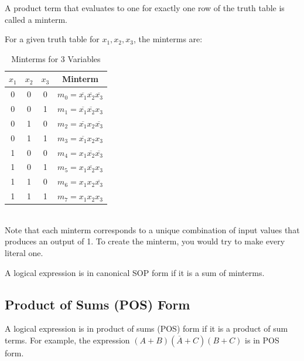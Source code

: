 \documentclass[11pt]{report}
\begin{document}
\begin{definition}[Minterm]
    A product term that evaluates to one for exactly one row of the truth table is called a minterm.
\end{definition}
\begin{example}[Minterm]
    For a given truth table for $x_1, x_2, x_3$, the minterms are:
    \begin{table}[h!]
        \centering
        \begin{tabular}{|c|c|c|c|}
            \hline
            $x_1$ & $x_2$ & $x_3$ & Minterm \\
            \hline
            0 & 0 & 0 & $m_0 = \overline{x_1}\overline{x_2}\overline{x_3}$ \\
            0 & 0 & 1 & $m_1 = \overline{x_1}\overline{x_2}x_3$ \\
            0 & 1 & 0 & $m_2 = \overline{x_1}x_2\overline{x_3}$ \\
            0 & 1 & 1 & $m_3 = \overline{x_1}x_2x_3$ \\
            1 & 0 & 0 & $m_4 = x_1\overline{x_2}\overline{x_3}$ \\
            1 & 0 & 1 & $m_5 = x_1\overline{x_2}x_3$ \\
            1 & 1 & 0 & $m_6 = x_1x_2\overline{x_3}$ \\
            1 & 1 & 1 & $m_7 = x_1x_2x_3$ \\
            \hline
        \end{tabular}
        \caption{Minterms for 3 Variables}
        \label{tab:minterms}

    \end{table}
    \\
    Note that each minterm corresponds to a unique combination of input values that produces an output of 1. To create the minterm, you would try to make every literal one.

\end{example}

\begin{definition}
    A logical expression is in canonical SOP form if it is a sum of minterms. 
\end{definition}

\subsection{Product of Sums (POS) Form}

\begin{definition}
    A logical expression is in product of sums (POS) form if it is a product of sum terms. For example, the expression $(A + B)(\overline{A} + C)(B + C)$ is in POS form.
\end{definition}
\end{document}

